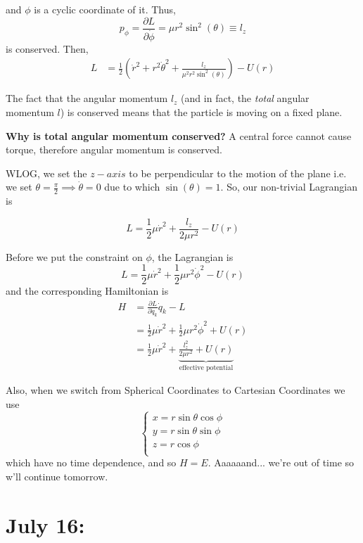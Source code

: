 \documentclass[11pt]{article}
\begin{document}
and $\phi$ is a cyclic coordinate of it. Thus,
\[ p_{\phi} = \frac{\partial L}{\partial \dot{\phi}} = \mu r^2 \sin^2(\theta) \equiv l_z \] is conserved. Then,
\begin{align*}
  L &= \frac{1}{2} \left(\dot{r}^2 + r^2 \dot{\theta}^2 + \frac{l_z}{\mu^2 r^2 \sin^2(\theta)}\right) - U(r)
\end{align*}

\vskip 0.5cm
The fact that the angular momentum $l_z$ (and in fact, the \emph{total} angular momentum $l$) is conserved means that the particle is moving on a fixed plane.

\begin{redbox}
  \textbf{Why is total angular momentum conserved?}
  A central force cannot cause torque, therefore angular momentum is conserved.
\end{redbox}

WLOG, we set the $z-axis$ to be perpendicular to the motion of the plane i.e. we set $\theta = \frac{\pi}{2} \implies \dot{\theta} = 0$ due to which $\sin(\theta) = 1$. So, our non-trivial Lagrangian is 

\[ L = \frac{1}{2}\mu \dot{r}^2 + \frac{l_z}{2\mu r^2} - U(r) \]

Before we put the constraint on $\phi$, the Lagrangian is 
\[ L = \frac{1}{2}\mu \dot{r}^2 + \frac{1}{2} \mu r^2 \dot{\phi}^2 - U(r) \] and the corresponding Hamiltonian is
\begin{align*}
  H &= \frac{\partial L}{\partial \dot{q}_k} \dot{q}_k - L \\
  &= \frac{1}{2}\mu\dot{r}^2 + \frac{1}{2}\mu r^2\dot{\phi}^2 + U(r) \\
  &= \frac{1}{2} \mu \dot{r}^2 + \underbrace{\frac{l_z^2}{2\mu r^2} + U(r)}_{\text{effective potential}}
\end{align*}

Also, when we switch from Spherical Coordinates to Cartesian Coordinates we use 
\[ \begin{cases}
  x = r\sin\theta\cos\phi \\
  y = r\sin\theta\sin\phi \\
  z = r\cos\phi \\
\end{cases} \]
which have no time dependence, and so $H = E$. Aaaaaand... we're out of time so w'll continue tomorrow.


\pagebreak
\section{July 16: }
\end{document}
